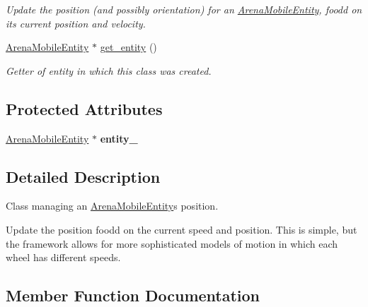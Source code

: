 \begin{DoxyCompactItemize}
\begin{DoxyCompactList}\small\item\em Update the position (and possibly orientation) for an \mbox{\hyperlink{class_arena_mobile_entity}{Arena\+Mobile\+Entity}}, foodd on its current position and velocity. \end{DoxyCompactList}\item 
\mbox{\label{class_motion_behavior_a1daf82b16d312ba6f5f71178e7fafa79}} 
\mbox{\hyperlink{class_arena_mobile_entity}{Arena\+Mobile\+Entity}} $\ast$ \mbox{\hyperlink{class_motion_behavior_a1daf82b16d312ba6f5f71178e7fafa79}{get\+\_\+entity}} ()
\begin{DoxyCompactList}\small\item\em Getter of entity in which this class was created. \end{DoxyCompactList}\end{DoxyCompactItemize}
\subsection*{Protected Attributes}
\begin{DoxyCompactItemize}
\item 
\mbox{\label{class_motion_behavior_a9254cf197657a2a52d89dbc01da31b8f}} 
\mbox{\hyperlink{class_arena_mobile_entity}{Arena\+Mobile\+Entity}} $\ast$ {\bfseries entity\+\_\+}
\end{DoxyCompactItemize}


\subsection{Detailed Description}
Class managing an \mbox{\hyperlink{class_arena_mobile_entity}{Arena\+Mobile\+Entity}}\textquotesingle{}s position. 

Update the position foodd on the current speed and position. This is simple, but the framework allows for more sophisticated models of motion in which each wheel has different speeds. 

\subsection{Member Function Documentation}
\mbox{\label{class_motion_behavior_a804f440bb7f03f19abec79a1ab671494}} 
